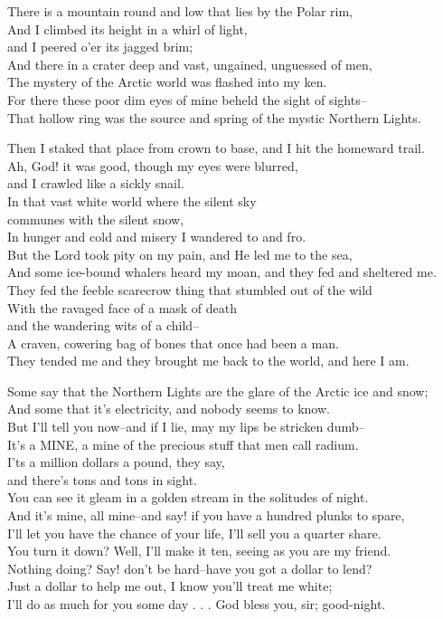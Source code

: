 \begin{poemblock}
There is a mountain round and low that lies by the Polar rim,\\
And I climbed its height in a whirl of light,\\
\idt and I peered o'er its jagged brim;\\
And there in a crater deep and vast, ungained, unguessed of men,\\
The mystery of the Arctic world was flashed into my ken.\\
For there these poor dim eyes of mine beheld the sight of sights--\\
That hollow ring was the source and spring of the mystic Northern Lights.

Then I staked that place from crown to base, and I hit the homeward trail.\\
Ah, God! it was good, though my eyes were blurred,\\
\idt and I crawled like a sickly snail.\\
In that vast white world where the silent sky\\
\idt communes with the silent snow,\\
In hunger and cold and misery I wandered to and fro.\\
But the Lord took pity on my pain, and He led me to the sea,\\
And some ice-bound whalers heard my moan, and they fed and sheltered me.\\
They fed the feeble scarecrow thing that stumbled out of the wild\\
With the ravaged face of a mask of death\\
\idt and the wandering wits of a child--\\
A craven, cowering bag of bones that once had been a man.\\
They tended me and they brought me back to the world, and here I am.

Some say that the Northern Lights are the glare of the Arctic ice and snow;\\
And some that it's electricity, and nobody seems to know.\\
But I'll tell you now--and if I lie, may my lips be stricken dumb--\\
It's a MINE, a mine of the precious stuff that men call radium.\\
I'ts a million dollars a pound, they say,\\
\idt and there's tons and tons in sight.\\
You can see it gleam in a golden stream in the solitudes of night.\\
And it's mine, all mine--and say! if you have a hundred plunks to spare,\\
I'll let you have the chance of your life, I'll sell you a quarter share.\\
You turn it down?  Well, I'll make it ten, seeing as you are my friend.\\
Nothing doing?  Say! don't be hard--have you got a dollar to lend?\\
Just a dollar to help me out, I know you'll treat me white;\\
I'll do as much for you some day . . . God bless you, sir; good-night.
\end{poemblock}
